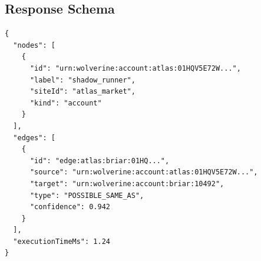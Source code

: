 \subsection{Response Schema}
\begin{verbatim}
{
  "nodes": [
    {
      "id": "urn:wolverine:account:atlas:01HQV5E72W...",
      "label": "shadow_runner",
      "siteId": "atlas_market",
      "kind": "account"
    }
  ],
  "edges": [
    {
      "id": "edge:atlas:briar:01HQ...",
      "source": "urn:wolverine:account:atlas:01HQV5E72W...",
      "target": "urn:wolverine:account:briar:10492",
      "type": "POSSIBLE_SAME_AS",
      "confidence": 0.942
    }
  ],
  "executionTimeMs": 1.24
}
\end{verbatim}
